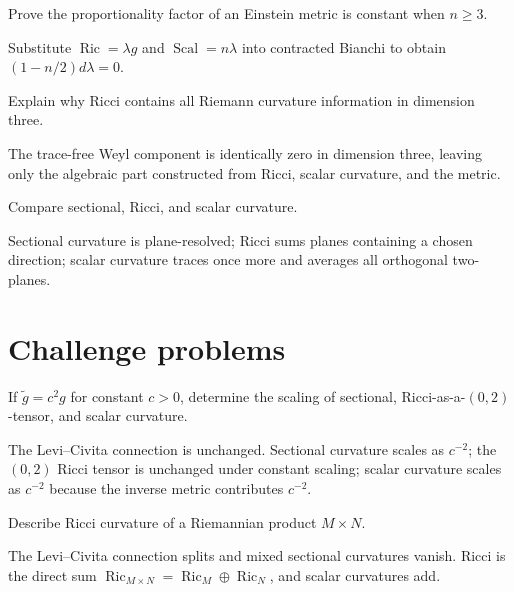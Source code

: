 \begin{problem}\label{prob:vii27-10}
Prove the proportionality factor of an Einstein metric is constant when \(n\ge3\).
\end{problem}
\begin{solution}
Substitute \(\operatorname{Ric}=\lambda g\) and \(\operatorname{Scal}=n\lambda\) into contracted Bianchi to obtain \((1-n/2)d\lambda=0\).
\end{solution}

\begin{problem}\label{prob:vii27-11}
Explain why Ricci contains all Riemann curvature information in dimension three.
\end{problem}
\begin{solution}
The trace-free Weyl component is identically zero in dimension three, leaving only the algebraic part constructed from Ricci, scalar curvature, and the metric.
\end{solution}

\begin{problem}\label{prob:vii27-12}
Compare sectional, Ricci, and scalar curvature.
\end{problem}
\begin{solution}
Sectional curvature is plane-resolved; Ricci sums planes containing a chosen direction; scalar curvature traces once more and averages all orthogonal two-planes.
\end{solution}

\section{Challenge problems}
\begin{problem}\label{prob:vii27-ch01}
If \(\widetilde g=c^2g\) for constant \(c>0\), determine the scaling of sectional, Ricci-as-a-\((0,2)\)-tensor, and scalar curvature.
\end{problem}
\begin{solution}
The Levi--Civita connection is unchanged. Sectional curvature scales as \(c^{-2}\); the \((0,2)\) Ricci tensor is unchanged under constant scaling; scalar curvature scales as \(c^{-2}\) because the inverse metric contributes \(c^{-2}\).
\end{solution}

\begin{problem}\label{prob:vii27-ch02}
Describe Ricci curvature of a Riemannian product \(M\times N\).
\end{problem}
\begin{solution}
The Levi--Civita connection splits and mixed sectional curvatures vanish. Ricci is the direct sum \(\operatorname{Ric}_{M\times N}=\operatorname{Ric}_M\oplus\operatorname{Ric}_N\), and scalar curvatures add.
\end{solution}

